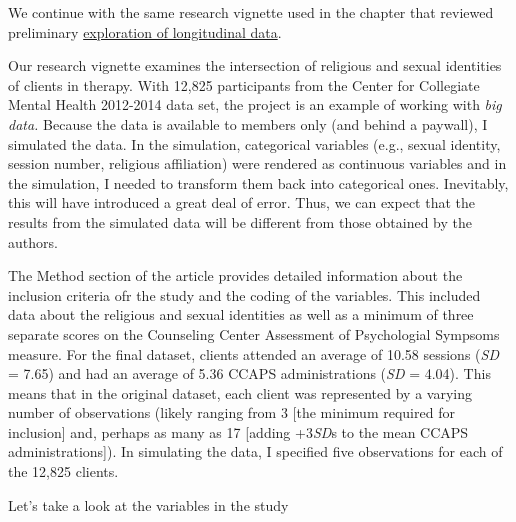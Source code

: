 \documentclass[
  11pt,
]{book}
\begin{document}
We continue with the same research vignette used in the chapter that reviewed preliminary \protect\hyperlink{MLMexplore}{exploration of longitudinal data}.

Our research vignette \citep{lefevor_religious_2017} examines the intersection of religious and sexual identities of clients in therapy. With 12,825 participants from the Center for Collegiate Mental Health 2012-2014 data set, the project is an example of working with \emph{big data.} Because the data is available to members only (and behind a paywall), I simulated the data. In the simulation, categorical variables (e.g., sexual identity, session number, religious affiliation) were rendered as continuous variables and in the simulation, I needed to transform them back into categorical ones. Inevitably, this will have introduced a great deal of error. Thus, we can expect that the results from the simulated data will be different from those obtained by the authors.

The Method section of the article provides detailed information about the inclusion criteria ofr the study and the coding of the variables. This included data about the religious and sexual identities as well as a minimum of three separate scores on the Counseling Center Assessment of Psychologial Sympsoms \citep[CCAPS,][]{locke_development_2012} measure. For the final dataset, clients attended an average of 10.58 sessions (\emph{SD} = 7.65) and had an average of 5.36 CCAPS administrations (\emph{SD} = 4.04). This means that in the original dataset, each client was represented by a varying number of observations (likely ranging from 3 {[}the minimum required for inclusion{]} and, perhaps as many as 17 {[}adding +3\emph{SD}s to the mean CCAPS administrations{]}). In simulating the data, I specified five observations for each of the 12,825 clients.

Let's take a look at the variables in the study
\end{document}
